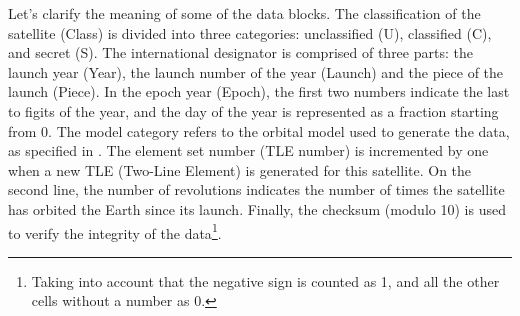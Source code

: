 \documentclass[../main.tex]{subfiles}
\begin{document}
Let's clarify the meaning of some of the data blocks. The classification of the satellite (Class) is divided into three categories: unclassified (U), classified (C), and secret (S). The international designator is comprised of three parts: the launch year (Year), the launch number of the year (Launch) and the piece of the launch (Piece). In the epoch year (Epoch), the first two numbers indicate the last to figits of the year, and the day of the year is represented as a fraction starting from 0. The model category refers to the orbital model used to generate the data, as specified in \cite{celestrak,wiki:spg}. The element set number (TLE number) is incremented by one when a new TLE (Two-Line Element) is generated for this satellite. On the second line, the number of revolutions indicates the number of times the satellite has orbited the Earth since its launch. Finally, the checksum (modulo 10) is used to verify the integrity of the data\footnote{Taking into account that the negative sign is counted as 1, and all the other cells without a number as 0.}.
\end{document}
